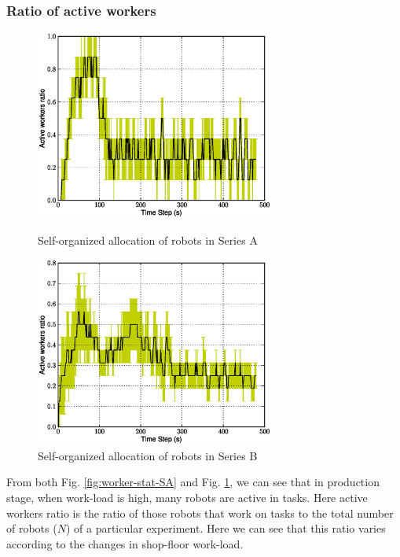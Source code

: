 \documentclass[smallcondensed]{svjour3}
\begin{document}
\subsubsection{Ratio of active workers}
\begin{figure}
\centering
\includegraphics[width=0.7\textwidth, angle=0]
{images/global-8robots/Plasticity-8robots2tasks.eps}
\caption{\small Self-organized allocation of robots in Series A}
\label{fig:worker-stat-SA}
%
\centering
\includegraphics[width=0.7\textwidth, angle=0]{images/WorkerRatio.eps}
\caption{\small Self-organized allocation of robots in Series B }
\label{fig:worker-stat-SB} %
\end{figure}
From both Fig. \ref{fig:worker-stat-SA} and Fig. \ref{fig:worker-stat-SB}, we can  see that in production stage, when work-load is high, many robots are active in tasks. Here active workers ratio is the ratio of those robots that work on tasks to the total number of robots ($N$) of a particular experiment.   Here we can see that this ratio varies according to the changes in shop-floor work-load.
\end{document}
